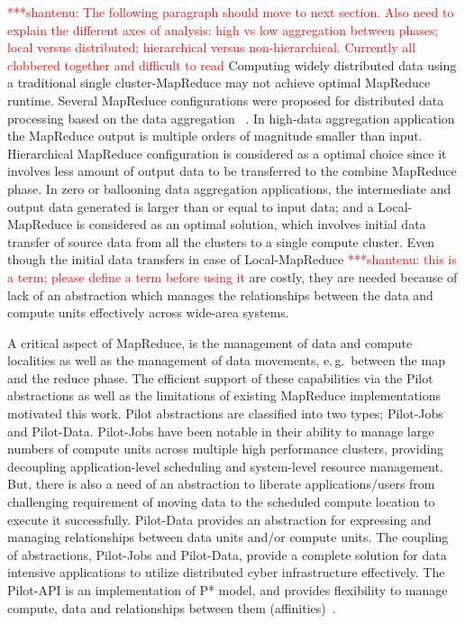 \documentclass{acm_proc_article-sp}
\newcommand{\jhanote}[1]{ {\textcolor{red} { ***shantenu: #1 }}}
\newcommand{\jhanote}[1]{}
\begin{document}

\jhanote{The following paragraph should move to next section. Also
  need to explain the different axes of analysis: high vs low
  aggregation between phases; local versus distributed; hierarchical
  versus non-hierarchical. Currently all clobbered together and
  difficult to read} Computing widely distributed data using a
traditional single cluster-MapReduce may not achieve optimal MapReduce
runtime. Several MapReduce configurations were proposed for
distributed data processing based on the data aggregation ~\cite
{weissman-mr-11}. In high-data aggregation application the MapReduce
output is multiple orders of magnitude smaller than input.
Hierarchical MapReduce configuration is considered as a optimal choice
since it involves less amount of output data to be transferred to the
combine MapReduce phase. In zero or ballooning data aggregation
applications, the intermediate and output data generated is larger
than or equal to input data; and a Local-MapReduce is considered as an
optimal solution, which involves initial data transfer of source data
from all the clusters to a single compute cluster. Even though the
initial data transfers in case of Local-MapReduce \jhanote{this is a
  term; please define a term before using it} are costly, they are
needed because of lack of an abstraction which manages the
relationships between the data and compute units effectively across
wide-area systems.

A critical aspect of MapReduce, is the management of data and compute localities as well as the management of data movements, e.\,g.\ between the map and the reduce phase. The efficient support of these capabilities via the Pilot abstractions as well as the limitations of existing MapReduce implementations motivated this work. Pilot abstractions are classified into two types; Pilot-Jobs and Pilot-Data. Pilot-Jobs have been notable in their ability to manage large numbers of compute units across multiple high performance clusters, providing decoupling
application-level scheduling and system-level resource management. But, there
is also a need of an abstraction to liberate applications/users from
challenging requirement of moving data to the scheduled compute location to
execute it successfully. Pilot-Data provides an abstraction for expressing and
managing relationships between data units and/or compute units. The coupling
of abstractions, Pilot-Jobs and Pilot-Data, provide a complete solution for
data intensive applications to utilize distributed cyber infrastructure
effectively. The Pilot-API is an implementation of P* model, and provides
flexibility to manage compute, data and relationships between them
(affinities)~\cite{pstar-2012}.
\end{document}
